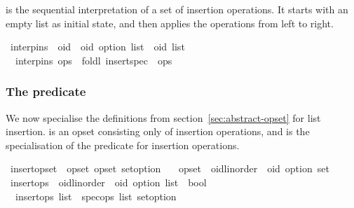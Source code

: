  is the sequential interpretation of a set of insertion operations.
It starts with an empty list as initial state, and then applies the operations from left to right.

\begin{isabelle}
\isamarkupfalse%
\ interp{\isacharunderscore}ins\ {\isacharcolon}{\isacharcolon}\ {\isachardoublequoteopen}{\isacharparenleft}{\isacharprime}oid\ {\isasymtimes}\ {\isacharprime}oid\ option{\isacharparenright}\ list\ {\isasymRightarrow}\ {\isacharprime}oid\ list{\isachardoublequoteclose}\ \isanewline
\ \ {\isachardoublequoteopen}interp{\isacharunderscore}ins\ ops\ {\isasymequiv}\ foldl\ insert{\isacharunderscore}spec\ {\isacharbrackleft}{\isacharbrackright}\ ops{\isachardoublequoteclose}%
\end{isabelle}

\subsubsection{The  predicate}

We now specialise the definitions from section~\ref{sec:abstract-opset} for list insertion.
 is an opset consisting only of insertion operations, and  is the specialisation of the  predicate for insertion operations.

\begin{isabelle}
\isamarkupfalse%
\ insert{\isacharunderscore}opset\ {\isacharequal}\ opset\ opset\ set{\isacharunderscore}option\isanewline
\ \ \ opset\ {\isacharcolon}{\isacharcolon}\ {\isachardoublequoteopen}{\isacharparenleft}{\isacharprime}oid{\isacharcolon}{\isacharcolon}{\isacharbraceleft}linorder{\isacharbraceright}\ {\isasymtimes}\ {\isacharprime}oid\ option{\isacharparenright}\ set{\isachardoublequoteclose}\isanewline
\isanewline
{}\isamarkupfalse%
\ insert{\isacharunderscore}ops\ {\isacharcolon}{\isacharcolon}\ {\isachardoublequoteopen}{\isacharparenleft}{\isacharprime}oid{\isacharcolon}{\isacharcolon}{\isacharbraceleft}linorder{\isacharbraceright}\ {\isasymtimes}\ {\isacharprime}oid\ option{\isacharparenright}\ list\ {\isasymRightarrow}\ bool{\isachardoublequoteclose}\ \isanewline
\ \ {\isachardoublequoteopen}insert{\isacharunderscore}ops\ list\ {\isasymequiv}\ spec{\isacharunderscore}ops\ list\ set{\isacharunderscore}option{\isachardoublequoteclose}
\end{isabelle}

